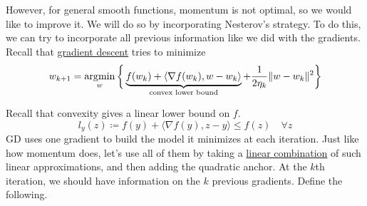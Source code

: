 	However, for general smooth functions, momentum is not optimal, so we would like to improve it. We will do so by incorporating Nesterov's strategy. To do this, we can try to incorporate all previous information like we did with the gradients. Recall that \hyperref[def:gradient_descent]{gradient descent} tries to minimize 
	\begin{equation}
		w_{k+1} = \operatorname*{\arg\!\min}_{w} \bigg\{ \underbrace{f(w_k) + \langle \nabla f(w_k), w - w_k \rangle}_{\text{convex lower bound}} + \frac{1}{2\eta_k} \|w - w_k\|^2 \bigg\}
	\end{equation}

	Recall that convexity gives a linear lower bound on $f$. 
	\begin{equation}
		l_y (z) \coloneqq f(y) + \langle \nabla f(y), z - y \rangle \leq f(z) \quad \forall z \label{heart}
	\end{equation}
	GD uses one gradient to build the model it minimizes at each iteration. Just like how momentum does, let's use all of them by taking a \hyperref[lin-def:linear-combination]{linear combination} of such linear approximations, and then adding the quadratic anchor. At the $k$th iteration, we should have information on the $k$ previous gradients. Define the following. 

